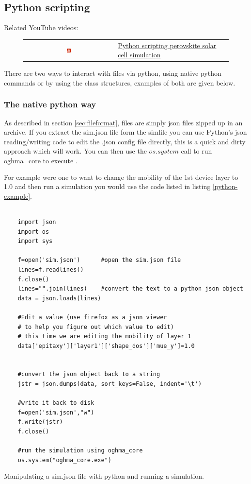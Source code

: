 \subsection{Python scripting}
\label{sec:pythonscripts}
Related YouTube videos:
\begin{figure}[H]
\begin{tabular}{ c l }

\includegraphics[width=0.05\textwidth]{./images/youtube.png}

&
\href{https://www.youtube.com/watch?v=vyeAzxBZjMg}{Python scripting perovskite solar cell simulation}

\end{tabular}
\end{figure}

There are two ways to interact with \fileext files via python, using native python commands or by using the \simname class structures, examples of both are given below.


\subsubsection{The native python way}
As described in section \ref{sec:fileformat}, \fileext files are simply json files zipped up in an archive. If you extract the sim.json file form the sim\fileext file you can use Python's json reading/writing code to edit the .json config file directly, this is a quick and dirty approach which will work. You can then use the $os.system$ call to run oghma\_core to execute \simname.

For example were one to want to change the mobility of the 1st device layer to 1.0 and then run a simulation you would use the code listed in listing \ref{python-example}.

\begin{listing}
\begin{verbatim}

	import json
	import os
	import sys

	f=open('sim.json')		#open the sim.json file
	lines=f.readlines()
	f.close()
	lines="".join(lines)	#convert the text to a python json object
	data = json.loads(lines)

	#Edit a value (use firefox as a json viewer
	# to help you figure out which value to edit)
	# this time we are editing the mobility of layer 1
	data['epitaxy']['layer1']['shape_dos']['mue_y']=1.0


	#convert the json object back to a string
	jstr = json.dumps(data, sort_keys=False, indent='\t')

	#write it back to disk
	f=open('sim.json',"w")
	f.write(jstr)
	f.close()

	#run the simulation using oghma_core
	os.system("oghma_core.exe")
\end{verbatim}
\caption{Manipulating a sim.json file with python and running a \simname simulation.} 
\label{python-example}
\end{listing}

